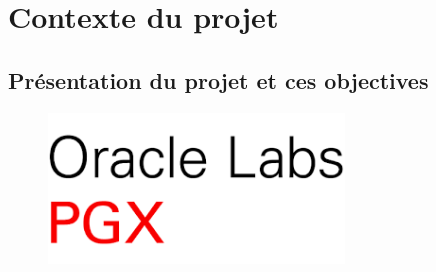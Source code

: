 \section{Contexte du projet}

\subsection{Présentation du projet et ces objectives}

\begin{figure}[h!]  
  \centering
    \includegraphics[width=0.7\textwidth]{chapitre1/Figures/PGX-logo.png}
\end{figure}

